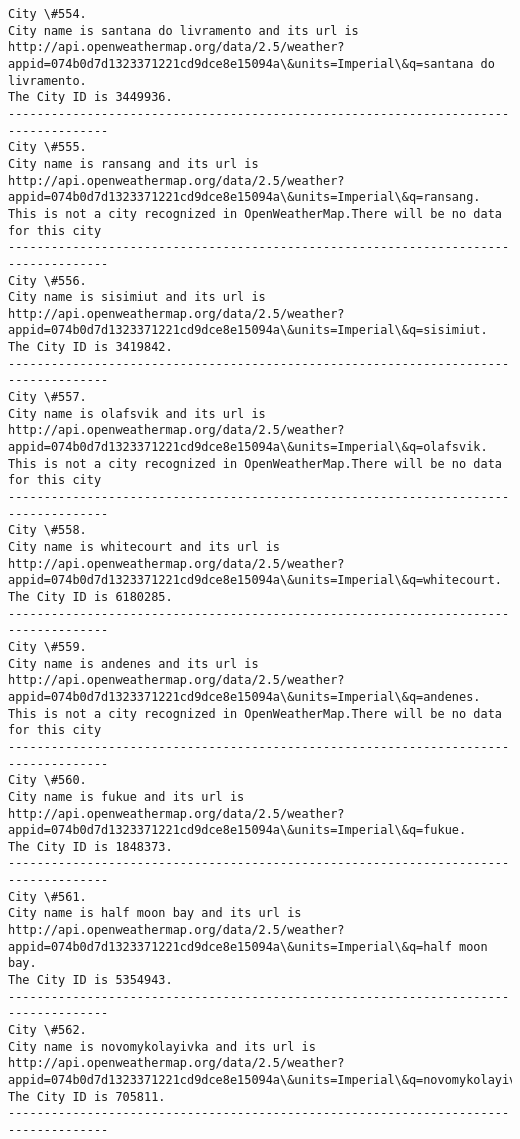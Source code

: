 \documentclass[11pt]{article}
\begin{document}
\begin{Verbatim}[commandchars=\\\{\}]
City \#554.
City name is santana do livramento and its url is http://api.openweathermap.org/data/2.5/weather?appid=074b0d7d1323371221cd9dce8e15094a\&units=Imperial\&q=santana do livramento.
The City ID is 3449936.
------------------------------------------------------------------------------------
City \#555.
City name is ransang and its url is http://api.openweathermap.org/data/2.5/weather?appid=074b0d7d1323371221cd9dce8e15094a\&units=Imperial\&q=ransang.
This is not a city recognized in OpenWeatherMap.There will be no data for this city
------------------------------------------------------------------------------------
City \#556.
City name is sisimiut and its url is http://api.openweathermap.org/data/2.5/weather?appid=074b0d7d1323371221cd9dce8e15094a\&units=Imperial\&q=sisimiut.
The City ID is 3419842.
------------------------------------------------------------------------------------
City \#557.
City name is olafsvik and its url is http://api.openweathermap.org/data/2.5/weather?appid=074b0d7d1323371221cd9dce8e15094a\&units=Imperial\&q=olafsvik.
This is not a city recognized in OpenWeatherMap.There will be no data for this city
------------------------------------------------------------------------------------
City \#558.
City name is whitecourt and its url is http://api.openweathermap.org/data/2.5/weather?appid=074b0d7d1323371221cd9dce8e15094a\&units=Imperial\&q=whitecourt.
The City ID is 6180285.
------------------------------------------------------------------------------------
City \#559.
City name is andenes and its url is http://api.openweathermap.org/data/2.5/weather?appid=074b0d7d1323371221cd9dce8e15094a\&units=Imperial\&q=andenes.
This is not a city recognized in OpenWeatherMap.There will be no data for this city
------------------------------------------------------------------------------------
City \#560.
City name is fukue and its url is http://api.openweathermap.org/data/2.5/weather?appid=074b0d7d1323371221cd9dce8e15094a\&units=Imperial\&q=fukue.
The City ID is 1848373.
------------------------------------------------------------------------------------
City \#561.
City name is half moon bay and its url is http://api.openweathermap.org/data/2.5/weather?appid=074b0d7d1323371221cd9dce8e15094a\&units=Imperial\&q=half moon bay.
The City ID is 5354943.
------------------------------------------------------------------------------------
City \#562.
City name is novomykolayivka and its url is http://api.openweathermap.org/data/2.5/weather?appid=074b0d7d1323371221cd9dce8e15094a\&units=Imperial\&q=novomykolayivka.
The City ID is 705811.
------------------------------------------------------------------------------------

\end{Verbatim}
\end{document}
